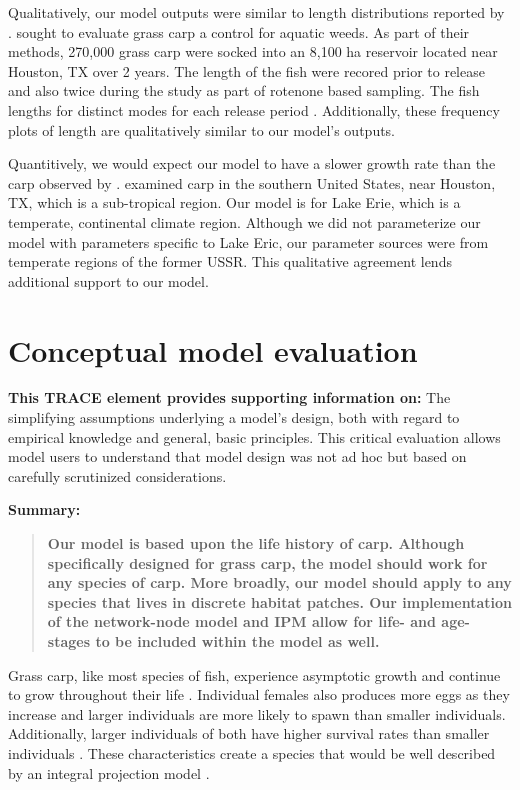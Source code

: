 \documentclass{article}[12pt]
\begin{document}
Qualitatively, our model outputs were similar to length distributions reported by \citet{martyn1986mapping}.
\citet{martyn1986mapping} sought to evaluate grass carp a control for aquatic weeds.
As part of their methods, 270,000 grass carp were socked into an 8,100 ha reservoir located near Houston, TX over 2 years. 
The length of the fish were recored prior to release and also twice during the study as part of rotenone based sampling.
The fish lengths for distinct modes for each release period \citep[Figure 11 in][]{martyn1986mapping}.
Additionally, these frequency plots of length are qualitatively similar to our model's outputs. 

Quantitively, we would expect our model to have a slower growth rate than the carp observed by \citet{martyn1986mapping}.
\citet{martyn1986mapping} examined carp in the southern United States, near Houston, TX, which is a sub-tropical region.
Our model is for Lake Erie, which is a temperate, continental climate region.
Although we did not parameterize our model with parameters specific to Lake Eric, our parameter sources were from temperate regions of the former USSR. 
This qualitative agreement lends additional support to our model. 


\section{Conceptual model evaluation}
\textbf{This TRACE element provides supporting information on:} The simplifying assumptions underlying a model's design, both with regard to empirical knowledge and general, basic principles. This critical evaluation allows model users to understand that model design was not ad hoc but based on carefully scrutinized considerations. 

\textbf{Summary:}
\begin{verse}
\textbf{
Our model is based upon the life history of carp.
Although specifically designed for grass carp, the model should work for any species of carp.
More broadly, our model should apply to any species that lives in discrete habitat patches.
Our implementation of the network-node model and IPM allow for life- and age-stages to be included within the model as well. 
} 
\end{verse}

Grass carp, like most species of fish, experience asymptotic growth and continue to grow throughout their life  \citep{lagler1962john}.
Individual females also produces more eggs as they increase and larger individuals are more likely to spawn than smaller individuals.
Additionally, larger individuals of both have higher survival rates than smaller individuals \citep{shireman1983synopsis}. 
These characteristics create a species that would be well described by an integral projection model \citep{ellner2006integral, ramula2009integral, merow2014advancing}.  
\end{document}
